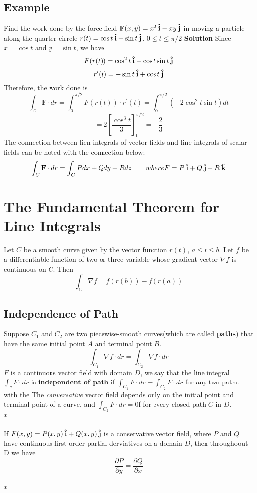 \subsection*{Example}
Find the work done by the force field $\textbf{F}(x,y) = x^2\:\boldsymbol{\hat{\textbf{i}}} - xy\:\boldsymbol{\hat{\textbf{j}}}$ in moving a particle along the quarter-cirrcle $r(t) = \cos{t}\:\boldsymbol{\hat{\textbf{i}}} + \sin{t}\:\boldsymbol{\hat{\textbf{j}}}$. $0\leq t\leq\pi/2$
\textbf{Solution} Since $x = \cos{t}$ and $y = \sin{t}$, we have $$F(r(t)) = \cos^2{t}\:\boldsymbol{\hat{\textbf{i}}} - \cos{t}\sin{t}\:\boldsymbol{\hat{\textbf{j}}}$$ $$r^\prime(t) = -\sin{t}\:\boldsymbol{\hat{\textbf{i}}} + \cos{t}\:\boldsymbol{\hat{\textbf{j}}}$$
Therefore, the work done is $$\int_C\textbf{F}\cdot dr = \int^{\pi/2}_0F(r(t))\cdot r^\prime(t) = \int^{\pi/2}_0(-2\cos^2{t}\sin{t})dt$$
$$= 2\left[\frac{\cos^3{t}}{3}\right]^{\pi/2}_0 = -\frac{2}{3}$$
The connection between lien integrals of vector fields and line integrals of scalar fields can be noted with the connection below:
$$\int_C\textbf{F}\cdot dr = \int_CP dx + Q dy + R dz\qquad where F = P\:\boldsymbol{\hat{\textbf{i}}} + Q\:\boldsymbol{\hat{\textbf{j}}} + R\:\boldsymbol{\hat{\textbf{k}}}$$

\section{The Fundamental Theorem for Line Integrals}
Let $C$ be a smooth curve given by the vector function $r(t)$, $a\leq t\leq b$. Let $f$ be a differentiable function of two or three variable whose gradient vector $\nabla f$ is continuous on $C$. Then
$$\int_C \nabla f = f(r(b)) - f(r(a))$$

\subsection*{Independence of Path}
Suppose $C_1$ and $C_2$ are two piecewise-smooth curves(which are called \textbf{paths}) that have the same initial point $A$ and terminal point $B$. 
$$\int_{C_1} \nabla f\cdot dr = \int_{C_2}\nabla f\cdot dr$$
$F$ is a continuous vector field with domain $D$, we say that the line integral $\int_c F\cdot dr$ is \textbf{independent of path} if $\int_{C_1}F\cdot dr = \int_{C_2}F\cdot dr$ for any two paths with the
The \textit{conversative} vector field depends only on the initial point and terminal point of a curve, and $\int_{C_2}F\cdot dr = 0$f for every closed path $C$ in $D$.\\*

If $F(x,y) = P(x,y)\:\boldsymbol{\hat{\textbf{i}}} + Q(x,y)\:\boldsymbol{\hat{\textbf{j}}}$ is a conservative vector field, where $P$ and $Q$ have continuous first-order partial derviatives on a domain $D$, then throughoout D we have 
$$\frac{\partial P}{\partial y} = \frac{\partial Q}{\partial x}$$\\*

